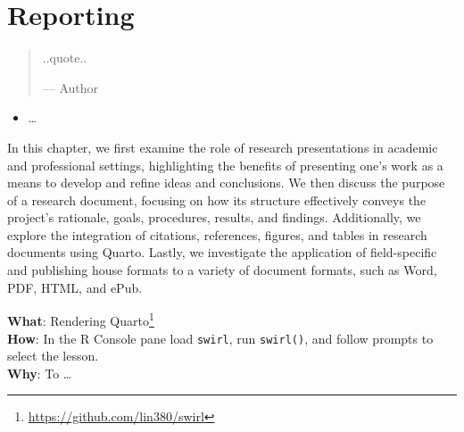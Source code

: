 \documentclass[
  letterpaper,
]{latex/krantz}
\providecommand{\tightlist}{%
  \setlength{\itemsep}{0pt}\setlength{\parskip}{0pt}}\usepackage{longtable,booktabs,array}
\DeclareRobustCommand{\href}[2]{#2\footnote{\url{#1}}}
\begin{document}
\hypertarget{sec-reporting}{%
\chapter{Reporting}\label{sec-reporting}}

\begin{quote}
..quote..

--- Author
\end{quote}

\begin{tcolorbox}[enhanced jigsaw, colbacktitle=quarto-callout-note-color!10!white, arc=.35mm, toprule=.15mm, breakable, colframe=quarto-callout-note-color-frame, bottomrule=.15mm, opacitybacktitle=0.6, coltitle=black, titlerule=0mm, colback=white, toptitle=1mm, bottomtitle=1mm, title=\textcolor{quarto-callout-note-color}{\faInfo}\hspace{0.5em}{Keys}, rightrule=.15mm, leftrule=.75mm, opacityback=0, left=2mm]

\begin{itemize}
\tightlist
\item
  \ldots{}
\end{itemize}

\end{tcolorbox}

In this chapter, we first examine the role of research presentations in
academic and professional settings, highlighting the benefits of
presenting one's work as a means to develop and refine ideas and
conclusions. We then discuss the purpose of a research document,
focusing on how its structure effectively conveys the project's
rationale, goals, procedures, results, and findings. Additionally, we
explore the integration of citations, references, figures, and tables in
research documents using Quarto. Lastly, we investigate the application
of field-specific and publishing house formats to a variety of document
formats, such as Word, PDF, HTML, and ePub.

\begin{tcolorbox}[enhanced jigsaw, colbacktitle=quarto-callout-tip-color!10!white, arc=.35mm, toprule=.15mm, breakable, colframe=quarto-callout-tip-color-frame, bottomrule=.15mm, opacitybacktitle=0.6, coltitle=black, titlerule=0mm, colback=white, toptitle=1mm, bottomtitle=1mm, title=\textcolor{quarto-callout-tip-color}{\faLightbulb}\hspace{0.5em}{Swirl}, rightrule=.15mm, leftrule=.75mm, opacityback=0, left=2mm]

\textbf{What}: \href{https://github.com/lin380/swirl}{Rendering
Quarto}\\
\textbf{How}: In the R Console pane load \texttt{swirl}, run
\texttt{swirl()}, and follow prompts to select the lesson.\\
\textbf{Why}: To \ldots{}

\end{tcolorbox}
\end{document}
